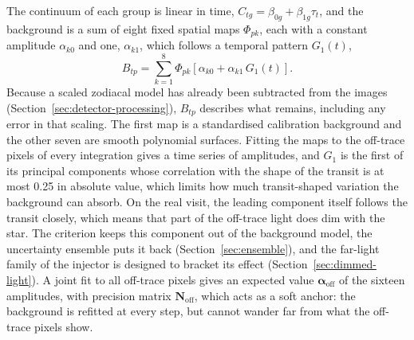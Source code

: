The continuum of each group is linear in time,
$C_{tg}=\beta_{0g}+\beta_{1g}\tau_t$, and the background is a sum of eight
fixed spatial maps $\Phi_{pk}$, each with a constant amplitude $\alpha_{k0}$
and one, $\alpha_{k1}$, which follows a temporal pattern $G_1(t)$,
\begin{equation}
 B_{tp}=\sum_{k=1}^{8}\Phi_{pk}
 \left[\alpha_{k0}+\alpha_{k1}\,G_1(t)\right].
 \label{eq:background-model}
\end{equation}
Because a scaled zodiacal model has already been subtracted from the images
(Section~\ref{sec:detector-processing}), $B_{tp}$ describes what remains,
including any error in that scaling. The first map is a standardised
calibration background and the other seven are smooth polynomial surfaces.
Fitting the maps to the off-trace pixels of every integration gives a time
series of amplitudes, and $G_1$ is the first of its principal components whose
correlation with the shape of the transit is at most 0.25 in absolute value,
which limits how much transit-shaped variation the background can absorb. On the real visit, the leading
component itself follows the transit closely, which means that part of the
off-trace light does dim with the star. The criterion keeps this component
out of the background model, the uncertainty ensemble puts it back
(Section~\ref{sec:ensemble}), and the far-light family of the injector
is designed to bracket its effect (Section~\ref{sec:dimmed-light}). A joint fit to all
off-trace pixels gives an expected value $\bm{\alpha}_{\mathrm{off}}$ of the
sixteen amplitudes, with precision matrix $\bm{N}_{\mathrm{off}}$, which acts
as a soft anchor: the background is refitted at every step, but cannot wander
far from what the off-trace pixels show.

